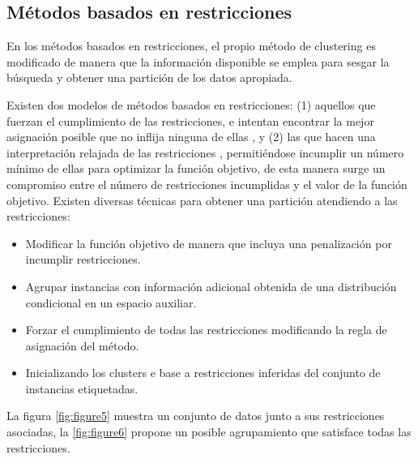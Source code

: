 \subsection{Métodos basados en restricciones}

En los métodos basados en restricciones, el propio método de clustering es modificado de manera que la información disponible se emplea para sesgar la búsqueda y obtener una partición de los datos apropiada.

Existen dos modelos de métodos basados en restricciones: (1) aquellos que fuerzan el cumplimiento de las restricciones, e intentan encontrar la mejor asignación posible que no inflija ninguna de ellas \cite{Wagstaff:2001b}\cite{DavidsonRavi:2005b}, y (2) las que hacen una interpretación relajada de las restricciones \cite{Basu:2004}\cite{Seagal:2003}\cite{DavidsonRavi:2005a}\cite{Law:2005}, permitiéndose incumplir un número mínimo de ellas para optimizar la función objetivo, de esta manera surge un compromiso entre el número de restricciones incumplidas y el valor de la función objetivo. Existen diversas técnicas para obtener una partición atendiendo a las restricciones:

\begin{itemize}
	
	\item Modificar la función objetivo de manera que incluya una penalización por incumplir restricciones. \cite{Demiriz:1999} \cite{DavidsonRavi:2005a}
	
	\item Agrupar instancias con información adicional obtenida de una distribución condicional en un espacio auxiliar. \cite{SinkkonenKaski:2000}
	
	\item Forzar el cumplimiento de todas las restricciones modificando la regla de asignación del método. \cite{Wagstaff:2001b}
	
	\item Inicializando los clusters e base a restricciones inferidas del conjunto de instancias etiquetadas.\cite{Basu:2002}
	
\end{itemize}

La figura \ref{fig:figure5} muestra un conjunto de datos junto a sus restricciones asociadas, la \ref{fig:figure6} propone un posible agrupamiento que satisface todas las restricciones.


